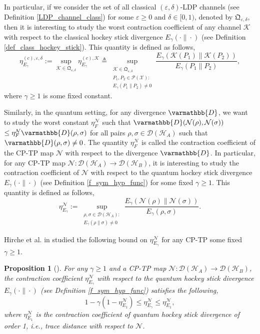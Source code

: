 \documentclass[onecolumn,ldraftcls, 11pt]{IEEEtran}
\newcommand{\RNum}[1]{\uppercase\expandafter{\romannumeral #1\relax}}
\newcommand{\eps}{\varepsilon}
\newcommand*{\cP}{\mathcal{P}}
\newcommand*{\cH}{\mathcal{H}}
\newcommand*{\cD}{\mathcal{D}}
\newcommand*{\cK}{\mathcal{K}}
\newcommand*{\cN}{\mathcal{N}}
\newcommand*{\cX}{\mathcal{X}}
\newtheorem{proposition}{Proposition}
\begin{document}
In particular, if we consider the set of all classical $(\eps,\delta)$-LDP channels (see Definition \ref{LDP_channel_class}) for some $\eps\geq 0$ and $ \delta \in [0,1)$, denoted by $\mathfrak{Q}_{\eps,\delta}$, then it is interesting to study the worst contraction coefficient of any channel $\cK$ with respect to the classical hockey stick divergence $E_{\gamma}(\cdot\|\cdot)$ (see Definition \ref{def_class_hockey_stick}). This quantity is defined as follows,
\begin{equation}
    \eta^{(c),\eps,\delta}_{E_{\gamma}} := 
    \sup_{\cK \in \mathfrak{Q}_{\eps,\delta}} 
    \eta^{(c),\cK}_{E_{\gamma}} \triangleq  \sup_{\substack{\cK \in \mathfrak{Q}_{\eps,\delta}\\ P_1,P_2 \in \cP(\cX):\\ E_{\gamma}(P_1\|P_2) \neq 0}}
    \frac{E_{\gamma}(\cK(P_1)\| \cK(P_2))}{E_{\gamma}(P_1\|P_2)},\label{contrac_class_hockey_stick_def_eq}
\end{equation}
where $\gamma \geq 1$ is some fixed constant. 


Similarly, in the quantum setting, for any divergence $\varmathbb{D}$, we want to study the worst constant $\eta^{\cN}_{F}$ such that $\varmathbb{D}(\cN(\rho),\cN(\sigma))$ $ \leq \eta^{\cN}_{F} \varmathbb{D}(\rho,\sigma)$ for all pairs  $\rho,\sigma \in \cD(\cH_A)$ such that $\varmathbb{D}(\rho,\sigma) \neq 0$. The quantity $\eta^{\cN}_{F}$ is called the contraction coefficient of the CP-TP map $\cN$ with respect to the divergence $\varmathbb{D}$.
In particular, for any CP-TP map 
$\cN : \cD(\cH_A) \to \cD(\cH_B)$, it is interesting to study the contraction coefficient of $\cN$ with respect to the quantum hockey stick divergence $E_{\gamma}(\cdot\|\cdot)$ (see Definition \ref{f_sym_hyp_func}) for some fixed $\gamma \geq 1$. This quantity is defined as follows,
\begin{equation}
    \eta^{\cN}_{E_{\gamma}} := \sup_{\substack{\rho,\sigma \in \cD(\cH_A):\\ E_{\gamma} (\rho\|\sigma) \neq 0}}\frac{E_{\gamma}(\cN(\rho)\|\cN(\sigma))}{E_{\gamma}(\rho,\sigma)}.\label{contrac_hockey_stick_def_eq}
\end{equation}

Hirche et al. in \cite{HRF23} studied the following bound on $\eta^{\cN}_{E_{\gamma}}$ for any CP-TP some fixed $\gamma \geq 1$.

\begin{proposition}[{\cite[Lemma \RNum{2}.4]{HRF23}}]\label{prop_contrac_hockey_stick}
    For any $\gamma \geq 1$ and a CP-TP map 
    $\cN : \cD(\cH_A) \to \cD(\cH_B)$, the contraction coefficient $\eta^{\cN}_{E_{\gamma}}$ with respect to the quantum hockey stick divergence $E_{\gamma}(\cdot\|\cdot)$ (see Definition \ref{f_sym_hyp_func}) satisfies the following,
    \begin{equation}
        1 - \gamma \left(1 - \eta^{\cN}_{E_1}\right) \leq \eta^{\cN}_{E_{\gamma}} \leq  \eta^{\cN}_{E_1},\label{prop_contrac_hockey_stick_eq}
    \end{equation}
    where $\eta^{\cN}_{E_1}$ is the contraction coefficient of quantum hockey stick divergence of order 1, i.e., trace distance with respect to $\cN$.
\end{proposition}
\end{document}
